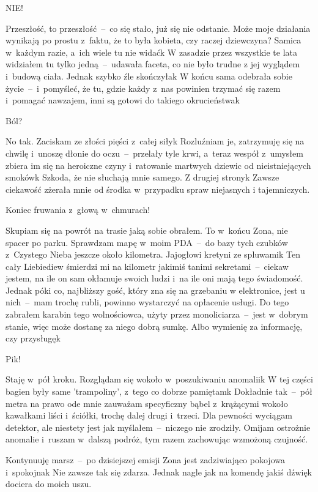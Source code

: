 \documentclass[../MAIN.tex]{subfiles}
\begin{document}
NIE!

Przeszłość, to przeszłość~--~co się stało, już się nie
odstanie.
Może moje działania wynikają po prostu z~faktu, że to była
kobieta, czy raczej dziewczyna? Samica w~każdym razie, a~ich
wiele tu nie widać\3k W zasadzie przez wszystkie te lata
widziałem tu tylko jedną~--~udawała faceta, co nie było trudne
z
jej wyglądem i~budową ciała. Jednak szybko źle skończyła\3k W
końcu sama odebrała sobie życie~--~i~pomyśleć, że tu, gdzie
każdy z~nas powinien trzymać się razem i~pomagać nawzajem, inni
są gotowi do takiego okrucieństwa\3k

Ból?

No tak. Zaciskam ze złości pięści z~całej siły\3k Rozluźniam
je, zatrzymuję się na chwilę i~unoszę dłonie do
oczu~--~przelały
tyle krwi, a~teraz wespół z~umysłem zbiera im się na heroiczne
czyny i~ratowanie martwych dziewic od nieistniejących smoków\3k
Szkoda, że nie słuchają mnie samego. Z drugiej strony\3k Zawsze
ciekawość zżerała mnie od środka w~przypadku spraw niejasnych i
tajemniczych.

Koniec fruwania z~głową w~chmurach!

Skupiam się na powrót na trasie jaką sobie obrałem. To w~końcu
Zona, nie spacer po parku. Sprawdzam mapę w~moim PDA~--~do bazy
tych czubków z~Czystego Nieba jeszcze około kilometra.
Jajogłowi kretyni ze spluwami\3k Ten cały Liebiediew śmierdzi
mi na kilometr jakimiś tanimi sekretami~--~ciekaw jestem, na
ile
on sam okłamuje swoich ludzi i~na ile oni mają tego świadomość.
Jednak póki co, najbliższy gość, który zna się na grzebaniu w
elektronice, jest u nich~--~mam trochę rubli, powinno
wystarczyć
na opłacenie usługi. Do tego zabrałem karabin tego
wolnościowca, użyty przez monoliciarza~--~jest w~dobrym stanie,
więc może dostanę za niego dobrą sumkę. Albo wymienię za
informację, czy przysługę\3k

Pik!

Staję w~pół kroku. Rozglądam się wokoło w~poszukiwaniu
anomalii\3k W tej części bagien były same 'trampoliny', z~tego
co dobrze pamiętam\3k Dokładnie tak~--~pół metra na prawo ode
mnie zauważam specyficzny bąbel z~krążącymi wokoło kawałkami
liści i~ściółki, trochę dalej drugi i~trzeci. Dla pewności
wyciągam detektor, ale niestety jest jak myślałem~--~niczego
nie
zrodziły. Omijam ostrożnie anomalie i~ruszam w~dalszą podróż,
tym razem zachowując wzmożoną czujność.

Kontynuuję marsz~--~po dzisiejszej emisji Zona jest
zadziwiająco
pokojowa i~spokojna\3k Nie zawsze tak się zdarza. Jednak nagle
jak na komendę jakiś dźwięk dociera do moich uszu.
\end{document}
